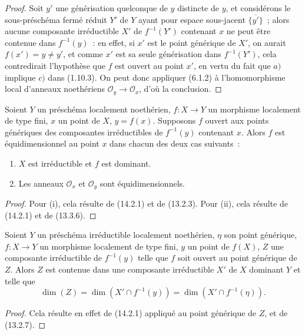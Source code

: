\begin{proof}
Soit $y'$ une générisation quelconque de $y$ distincte de $y$, et considérons le
sous-préschéma fermé réduit $Y'$ de $Y$ ayant pour espace sous-jacent
$\overline{\{y'\}}$~; alors aucune composante irréductible $X'$ de $f^{-1}(Y')$
contenant $x$ ne peut être contenue dans $f^{-1}(y)$~: en effet, si $x'$ est le
point générique de $X'$, on aurait $f(x')=y\ne y'$, et comme $x'$ est sa seule
générisation dans $f^{-1}(Y')$, cela contredirait l'hypothèse que $f$ est ouvert
au point $x'$, en vertu du fait que $a)$ implique $c)$ dans (1.10.3). On peut donc
appliquer (6.1.2) à l'homomorphisme local d'anneaux noethériens
$\mathcal O_y\to\mathcal O_x$, d'où la conclusion.
\end{proof}

\begin{corollary}[14.2.2]
\label{IV.14.2.2-fr}
Soient $Y$ un préschéma localement noethérien, $f:X\to Y$ un morphisme localement
de type fini, $x$ un point de $X$, $y=f(x)$. Supposons $f$ ouvert aux points
génériques des composantes irréductibles de $f^{-1}(y)$ contenant $x$. Alors $f$
est équidimensionnel au point $x$ dans chacun des deux cas suivants~:
\begin{enumerate}[label=(\roman*)]
  \item $X$ est irréductible et $f$ est dominant.
  \item Les anneaux $\mathcal O_x$ et $\mathcal O_y$ sont équidimensionnels.
\end{enumerate}
\end{corollary}

\begin{proof}
Pour (i), cela résulte de (14.2.1) et de (13.2.3). Pour (ii), cela résulte de
(14.2.1) et de (13.3.6).
\end{proof}

\begin{proposition}[14.2.3]
\label{IV.14.2.3-fr}
Soient $Y$ un préschéma irréductible localement noethérien, $\eta$ son point
générique, $f:X\to Y$ un morphisme localement de type fini, $y$ un point de
$f(X)$, $Z$ une composante irréductible de $f^{-1}(y)$ telle que $f$ soit ouvert
au point générique de $Z$. Alors $Z$ est contenue dans une composante irréductible
$X'$ de $X$ dominant $Y$ et telle que
\[
  \dim(Z)=\dim(X'\cap f^{-1}(y))=\dim(X'\cap f^{-1}(\eta)).
\]
\end{proposition}

\begin{proof}
Cela résulte en effet de (14.2.1) appliqué au point générique de $Z$, et de
(13.2.7).
\end{proof}

